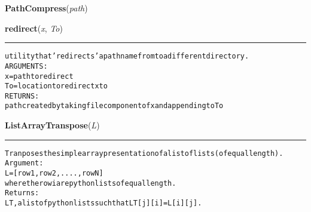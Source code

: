     \label{System:Utils:PathCompress}

    \vspace{0.5ex}

\hspace{.8\funcindent}\begin{boxedminipage}{\funcwidth}

    \raggedright \textbf{PathCompress}(\textit{path})

\setlength{\parskip}{2ex}
\setlength{\parskip}{1ex}
    \end{boxedminipage}

    \label{System:Utils:redirect}

    \vspace{0.5ex}

\hspace{.8\funcindent}\begin{boxedminipage}{\funcwidth}

    \raggedright \textbf{redirect}(\textit{x}, \textit{To})

    \vspace{-1.5ex}

    \rule{\textwidth}{0.5\fboxrule}
\setlength{\parskip}{2ex}
\begin{alltt}

utility that 'redirects' a path name from to a different directory. 
ARGUMENTS:
        x = path to redirect
        To = location to redirect x to
RETURNS:
        path created by taking file component of x and appending to To
\end{alltt}

\setlength{\parskip}{1ex}
    \end{boxedminipage}

    \label{System:Utils:ListArrayTranspose}

    \vspace{0.5ex}

\hspace{.8\funcindent}\begin{boxedminipage}{\funcwidth}

    \raggedright \textbf{ListArrayTranspose}(\textit{L})

    \vspace{-1.5ex}

    \rule{\textwidth}{0.5\fboxrule}
\setlength{\parskip}{2ex}
\begin{alltt}

Tranposes the simple array presentation of a list of lists (of equal length). 
Argument:
        L = [row1, row2, ...., rowN]
        where the rowi are python lists of equal length. 
Returns:        
        LT, a list of python lists such that LT[j][i] = L[i][j]. 
\end{alltt}

\setlength{\parskip}{1ex}
    \end{boxedminipage}

